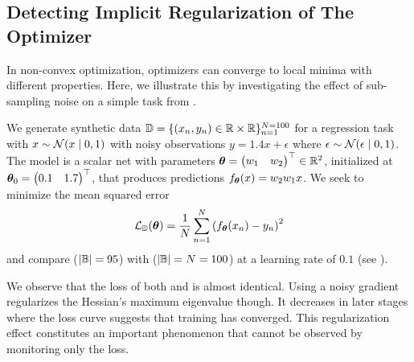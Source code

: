 \subsection{Detecting Implicit Regularization of The
  Optimizer}\label{cockpit::app:implicit_regularization_exp}

In non-convex optimization, optimizers can converge to local minima with
different properties. Here, we illustrate this by investigating the effect of
sub-sampling noise on a simple task from
\cite{mulayoff2020unique,ginsburg2020regularization}.

We generate synthetic data ${\mathbb{D}} = \{(x_n, y_n) \in {\mathbb{R}} \times {\mathbb{R}}
\}_{n=1}^{N=100}$ for a regression task with $x \sim {\mathcal{N}}(x\;|\;0, 1)$
with noisy observations $y = 1.4 x + \epsilon$ where $\epsilon \sim
{\mathcal{N}}(\epsilon\;|\;0,1)$. The model is a scalar net with parameters
${\bm{\theta}} = \begin{pmatrix} w_1 & w_2 \end{pmatrix}^\top \in {\mathbb{R}}^2$, initialized
at ${\bm{\theta}}_0 = \begin{pmatrix} 0.1 & 1.7 \end{pmatrix}^\top$, that produces
predictions $f_{{\bm{\theta}}}(x) = w_2 w_1 x$. We seek to minimize the mean squared
error
\begin{equation*}
  {\mathcal{L}}_{\mathbb{D}}({\bm{\theta}}) = \frac{1}{N} \sum_{n=1}^{N} \left( f_{{\bm{\theta}}}(x_n) - y_n \right)^2
\end{equation*}
and compare \sgd ($|{\mathbb{B}}|=95$) with \gd ($|{\mathbb{B}}|= N =100$) at a learning rate of
$0.1$ (see ).

We observe that the loss of both \sgd and \gd is almost identical. Using a noisy
gradient regularizes the Hessian's maximum eigenvalue though. It decreases in
later stages where the loss curve suggests that training has converged. This
regularization effect constitutes an important phenomenon that cannot be
observed by monitoring only the loss.


